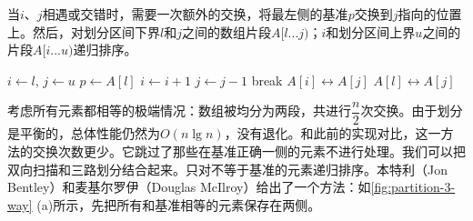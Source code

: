 \documentclass[b5paper]{ctexart}
\begin{document}
当$i$、$j$相遇或交错时，需要一次额外的交换，将最左侧的基准$p$交换到$j$指向的位置上。然后，对划分区间下界$l$和$j$之间的数组片段$A[l ... j)$；$i$和划分区间上界$u$之间的片段$A[i ... u)$递归排序。

\begin{algorithmic}[1]
 \Comment{排序区间：$[l, u)$}
   
    \State $i \gets l$, $j \gets u$
    \State $p \gets A[l]$ 
    \Loop
      \Repeat
        \State $i \gets i + 1$
       
      \Repeat
        \State $j \gets j - 1$
       
        \State break
      \EndIf
      \State {} $A[i] \leftrightarrow A[j]$
    \EndLoop
    \State {} $A[l] \leftrightarrow A[j]$ 
    \State {}
    \State {}
  \EndIf
\EndProcedure
\end{algorithmic}

考虑所有元素都相等的极端情况：数组被均分为两段，共进行$\dfrac{n}{2}$次交换。由于划分是平衡的，总体性能仍然为$O(n \lg n)$，没有退化。和此前的实现对比，这一方法的交换次数更少。它跳过了那些在基准正确一侧的元素不进行处理。我们可以把双向扫描和三路划分结合起来。只对不等于基准的元素递归排序。本特利（Jon Bentley）和麦基尔罗伊（Douglas McIlroy）给出了一个方法：如\cref{fig:partition-3-way} (a)所示，先把所有和基准相等的元素保存在两侧\cite{3-way-part}\cite{opt-qs}。
\end{document}
